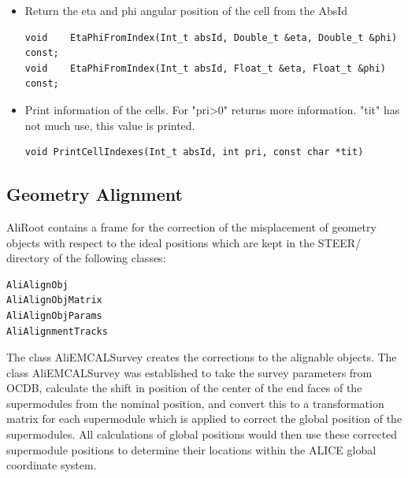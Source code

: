  
\begin{itemize}
\item Return the eta and phi angular position of the cell from the AbsId

\begin{DDbox}{\linewidth}
\begin{lstlisting}
void    EtaPhiFromIndex(Int_t absId, Double_t &eta, Double_t &phi) const;
void    EtaPhiFromIndex(Int_t absId, Float_t &eta, Float_t &phi) const;
\end{lstlisting}
\end{DDbox}
\item Print information of the cells. For "pri>0" returns more information. "tit" has not much use, this value is printed.

\begin{DDbox}{\linewidth}
\begin{lstlisting}
void PrintCellIndexes(Int_t absId, int pri, const char *tit)
\end{lstlisting}
\end{DDbox}
\end{itemize} 

\subsection{Geometry Alignment}
AliRoot contains a frame for the correction of the misplacement of geometry objects with respect to the ideal positions which are kept in the STEER/ directory of the following classes:

\begin{DDbox}{\linewidth}
\begin{lstlisting}
AliAlignObj  
AliAlignObjMatrix  
AliAlignObjParams  
AliAlignmentTracks
\end{lstlisting}
\end{DDbox}

The class AliEMCALSurvey creates the corrections to the alignable objects.  The class AliEMCALSurvey was established to take the survey parameters from OCDB, calculate the shift in position of the center of the end faces of the supermodules from the nominal position, and convert this to a transformation matrix for each supermodule which is applied to correct the global position of the supermodules.  All calculations of global positions would then use these corrected supermodule positions to determine their locations within the ALICE global coordinate system. 
